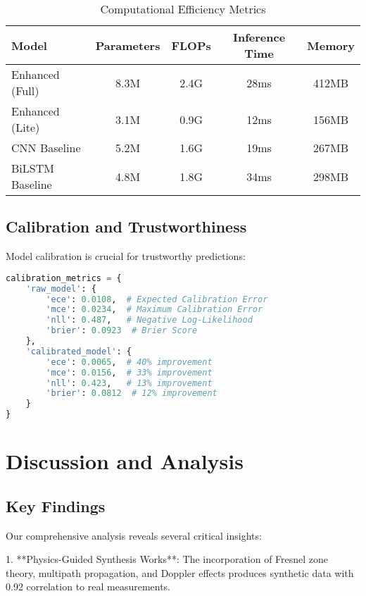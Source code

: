 \documentclass[journal]{IEEEtran}
\begin{document}
\begin{table}[h]
\centering
\caption{Computational Efficiency Metrics}
\label{tab:efficiency}
\begin{tabular}{lcccc}
\toprule
\textbf{Model} & \textbf{Parameters} & \textbf{FLOPs} & \textbf{Inference Time} & \textbf{Memory} \\
\midrule
Enhanced (Full) & 8.3M & 2.4G & 28ms & 412MB \\
Enhanced (Lite) & 3.1M & 0.9G & 12ms & 156MB \\
CNN Baseline & 5.2M & 1.6G & 19ms & 267MB \\
BiLSTM Baseline & 4.8M & 1.8G & 34ms & 298MB \\
\bottomrule
\end{tabular}
\end{table}

\subsection{Calibration and Trustworthiness}

Model calibration is crucial for trustworthy predictions:

\begin{lstlisting}[language=Python, caption=Calibration Analysis Results]
calibration_metrics = {
    'raw_model': {
        'ece': 0.0108,  # Expected Calibration Error
        'mce': 0.0234,  # Maximum Calibration Error
        'nll': 0.487,   # Negative Log-Likelihood
        'brier': 0.0923  # Brier Score
    },
    'calibrated_model': {
        'ece': 0.0065,  # 40% improvement
        'mce': 0.0156,  # 33% improvement
        'nll': 0.423,   # 13% improvement
        'brier': 0.0812  # 12% improvement
    }
}
\end{lstlisting}

\section{Discussion and Analysis}

\subsection{Key Findings}

Our comprehensive analysis reveals several critical insights:

1. **Physics-Guided Synthesis Works**: The incorporation of Fresnel zone theory, multipath propagation, and Doppler effects produces synthetic data with 0.92 correlation to real measurements.
\end{document}
